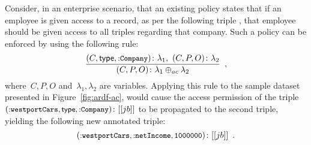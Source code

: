 \begin{example}
  Consider, in an enterprise scenario, that an existing policy states that if an employee is given access to a
   record, as per the following triple , that employee should be given
  access to all triples regarding that company. Such a policy can be enforced by using the following rule:
  \[
  \frac{ 
    \fuzzyg{\triple{C, \typeR, \uri{{:}Company}}}{\lambda_{1}},\ \fuzzyg{\triple{C, P, O}}{\lambda_{2}} 
  }{ 
    \fuzzyg{\triple{C, P, O}}{\lambda_{1} \oplus_{ac} \lambda_{2}} } \enspace ,
  \]
  where~$C, P, O$ and~$\lambda_{1}, \lambda_{2}$ are variables.
  Applying this rule to the sample dataset presented in Figure~\ref{fig:ardf-ac}, would cause the access permission of
  the triple~$\mbox{$(\mbox{\small$\mathtt{{:}westportCars, \mathsf{type}, \mbox{\small$\mathtt{{:}Company}$}}$})\colon[[jb]]$}$ to be propagated to the second
  triple, yielding the following new annotated triple: 
  $$\mbox{$(\mbox{\small$\mathtt{{:}westportCars, \mbox{\small$\mathtt{{:}netIncome}$}, 1000000}$})\colon[[jb]]$} \enspace .$$
\end{example}





